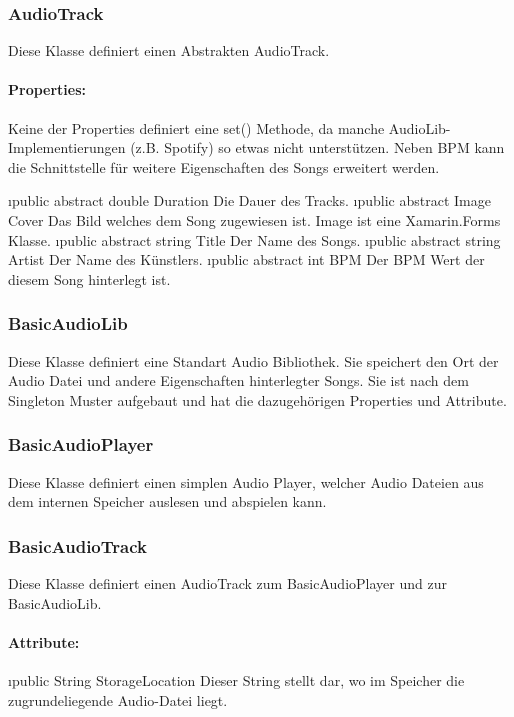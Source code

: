 \documentclass[../entwurf.tex]{subfiles}
\begin{document}
			\subsubsection{AudioTrack}
				Diese Klasse definiert einen Abstrakten AudioTrack.
				\paragraph{Properties:}
					Keine der Properties definiert eine set() Methode, da manche AudioLib-Implementierungen (z.B. Spotify) so etwas nicht
					unterstützen. Neben BPM kann die Schnittstelle für weitere Eigenschaften des Songs erweitert werden.
					\begin{itemize}
						\i{public abstract double Duration} Die Dauer des Tracks.
						\i{public abstract Image Cover} Das Bild welches dem Song zugewiesen ist. Image ist eine Xamarin.Forms Klasse.
						\i{public abstract string Title} Der Name des Songs.
						\i{public abstract string Artist} Der Name des Künstlers.
						\i{public abstract int BPM} Der BPM Wert der diesem Song hinterlegt ist.
					\end{itemize}
			\subsubsection{BasicAudioLib}
				Diese Klasse definiert eine Standart Audio Bibliothek. Sie speichert den Ort der Audio Datei und andere Eigenschaften hinterlegter
				Songs. Sie ist nach dem Singleton Muster aufgebaut und hat die dazugehörigen Properties und Attribute.
			\subsubsection{BasicAudioPlayer}
				Diese Klasse definiert einen simplen Audio Player, welcher Audio Dateien aus dem internen Speicher auslesen und abspielen kann.
			\subsubsection{BasicAudioTrack}
				Diese Klasse definiert einen AudioTrack zum BasicAudioPlayer und zur BasicAudioLib.
				\paragraph{Attribute:}
					\begin{itemize}
						\i{public String StorageLocation} Dieser String stellt dar, wo im Speicher die zugrundeliegende Audio-Datei liegt.
					\end{itemize}
\end{document}
